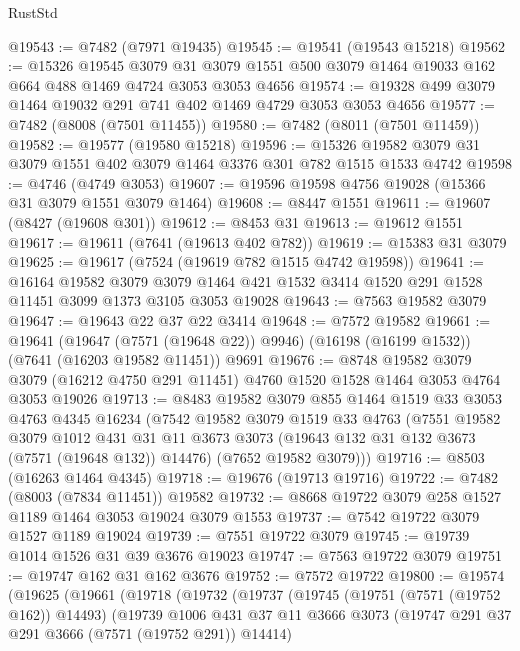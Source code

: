 \begin{lexlean}{RustStd}
\begin{coremodule}
@19543 := @7482 (@7971 @19435)
@19545 := @19541 (@19543 @15218)
@19562 := @15326
    @19545
    @3079
    @31
    @3079
    @1551
    @500
    @3079
    @1464
    @19033
    @162
    @664
    @488
    @1469
    @4724
    @3053
    @3053
    @4656
@19574 := @19328 @499 @3079 @1464 @19032 @291 @741 @402 @1469 @4729 @3053 @3053 @4656
@19577 := @7482 (@8008 (@7501 @11455))
@19580 := @7482 (@8011 (@7501 @11459))
@19582 := @19577 (@19580 @15218)
@19596 := @15326 @19582 @3079 @31 @3079 @1551 @402 @3079 @1464 @3376 @301 @782 @1515 @1533 @4742
@19598 := @4746 (@4749 @3053)
@19607 := @19596 @19598 @4756 @19028 (@15366 @31 @3079 @1551 @3079 @1464)
@19608 := @8447 @1551
@19611 := @19607 (@8427 (@19608 @301))
@19612 := @8453 @31
@19613 := @19612 @1551
@19617 := @19611 (@7641 (@19613 @402 @782))
@19619 := @15383 @31 @3079
@19625 := @19617 (@7524 (@19619 @782 @1515 @4742 @19598))
@19641 := @16164
    @19582
    @3079
    @3079
    @1464
    @421
    @1532
    @3414
    @1520
    @291
    @1528
    @11451
    @3099
    @1373
    @3105
    @3053
    @19028
@19643 := @7563 @19582 @3079
@19647 := @19643 @22 @37 @22 @3414
@19648 := @7572 @19582
@19661 := @19641
    (@19647 (@7571 (@19648 @22)) @9946)
    (@16198 (@16199 @1532))
    (@7641 (@16203 @19582 @11451))
    @9691
@19676 := @8748
    @19582
    @3079
    @3079
    (@16212 @4750 @291 @11451)
    @4760
    @1520
    @1528
    @1464
    @3053
    @4764
    @3053
    @19026
@19713 := @8483
    @19582
    @3079
    @855
    @1464
    @1519
    @33
    @3053
    @4763
    @4345
    @16234
    (@7542
      @19582
      @3079
      @1519
      @33
      @4763
      (@7551
        @19582
        @3079
        @1012
        @431
        @31
        @11
        @3673
        @3073
        (@19643 @132 @31 @132 @3673 (@7571 (@19648 @132)) @14476)
        (@7652 @19582 @3079)))
@19716 := @8503 (@16263 @1464 @4345)
@19718 := @19676 (@19713 @19716)
@19722 := @7482 (@8003 (@7834 @11451)) @19582
@19732 := @8668 @19722 @3079 @258 @1527 @1189 @1464 @3053 @19024 @3079 @1553
@19737 := @7542 @19722 @3079 @1527 @1189 @19024
@19739 := @7551 @19722 @3079
@19745 := @19739 @1014 @1526 @31 @39 @3676 @19023
@19747 := @7563 @19722 @3079
@19751 := @19747 @162 @31 @162 @3676
@19752 := @7572 @19722
@19800 := @19574
    (@19625
      (@19661
        (@19718
          (@19732
            (@19737
              (@19745
                (@19751 (@7571 (@19752 @162)) @14493)
                (@19739
                  @1006
                  @431
                  @37
                  @11
                  @3666
                  @3073
                  (@19747 @291 @37 @291 @3666 (@7571 (@19752 @291)) @14414)

\end{coremodule}
\end{lexlean}

